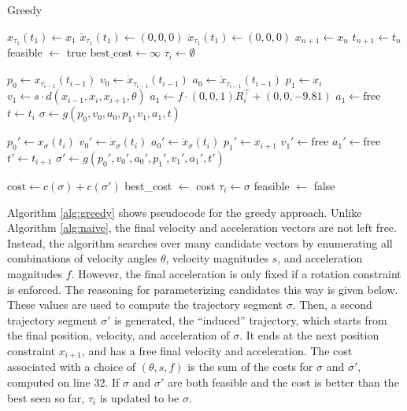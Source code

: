 \documentclass[pageno]{jpaper}
\newcommand{\quotes}[1]{``#1''}
\begin{document}
\begin{algorithm}
  \caption{Greedy}\label{alg:greedy}
  \begin{algorithmic}[1]
  \State $x_{\tau_1}(t_1) \gets x_1$
  \State $\dot x_{\tau_1}(t_1) \gets (0, 0, 0)$
  \State $\ddot x_{\tau_1}(t_1) \gets (0, 0, 0)$
  \State $x_{n+1} \gets x_n$
  \State $t_{n+1} \gets t_n$
  \State feasible $\gets$ true
    \State $\text{best\_cost} \gets \infty$
    \State $\tau_i \gets \emptyset$

      \State $p_0 \gets x_{\tau_{i-1}}(t_{i-1})$
      \State $v_0 \gets \dot x_{\tau_{i-1}}(t_{i-1})$
      \State $a_0 \gets \ddot x_{\tau_{i-1}}(t_{i-1})$
      \State $p_1 \gets x_i$
      \State $v_1 \gets s \cdot d(x_{i-1}, x_i, x_{i+1}, \theta)$
        \State $a_1 \gets f \cdot (0, 0, 1) R_i^\top + (0, 0, -9.81)$
      \Else
        \State $a_1 \gets \text{free}$
      \EndIf
      \State $t \gets t_i$
      \State $\sigma \gets g(p_0, v_0, a_0, p_1, v_1, a_1, t)$
      \State

      \State $p_0' \gets x_{\sigma}(t_i)$
      \State $v_0' \gets \dot x_{\sigma}(t_i)$
      \State $a_0' \gets \ddot x_{\sigma}(t_i)$
      \State $p_1' \gets x_{i+1}$
      \State $v_1' \gets \text{free}$
      \State $a_1' \gets \text{free}$
      \State $t' \gets t_{i+1}$
      \State $\sigma' \gets g(p_0', v_0', a_0', p_1', v_1', a_1', t')$
      \State

      \State $\text{cost} \gets c(\sigma) + c(\sigma')$
        \State best\_cost $\gets$ cost
        \State $\tau_i \gets \sigma$
      \EndIf
    \EndFor
      \State feasible $\gets$ false
    \EndIf
  \EndFor
  \end{algorithmic}
  \end{algorithm}

Algorithm \ref{alg:greedy} shows pseudocode for the greedy approach. Unlike Algorithm \ref{alg:naive}, the final velocity and acceleration vectors are not left free. Instead, the algorithm searches over many candidate vectors by enumerating all combinations of velocity angles $\theta$, velocity magnitudes $s$, and acceleration magnitudes $f$. However, the final acceleration is only fixed if a rotation constraint is enforced. The reasoning for parameterizing candidates this way is given below. These values are used to compute the trajectory segment $\sigma$. Then, a second trajectory segment $\sigma'$ is generated, the \quotes{induced} trajectory, which starts from the final position, velocity, and acceleration of $\sigma$. It ends at the next position constraint $x_{i+1}$, and has a free final velocity and acceleration. The cost associated with a choice of $(\theta, s, f)$ is the sum of the costs for $\sigma$ and $\sigma'$, computed on line 32. If $\sigma$ and $\sigma'$ are both feasible and the cost is better than the best seen so far, $\tau_i$ is updated to be $\sigma$.
\end{document}
